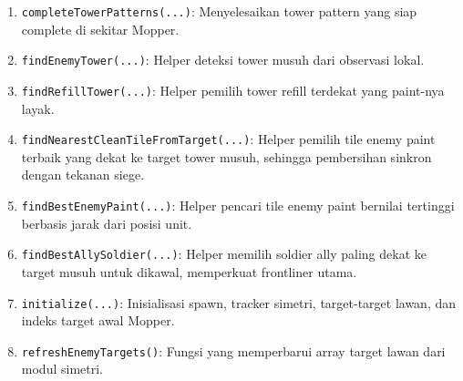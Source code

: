 \begin{enumerate}
	\item \texttt{completeTowerPatterns(...)}:
	      Menyelesaikan tower pattern yang siap complete di sekitar Mopper.

	\item \texttt{findEnemyTower(...)}:
	      Helper deteksi tower musuh dari observasi lokal.

	\item \texttt{findRefillTower(...)}:
	      Helper pemilih tower refill terdekat yang paint-nya layak.

	\item \texttt{findNearestCleanTileFromTarget(...)}:
	      Helper pemilih tile enemy paint terbaik yang dekat ke target tower musuh, sehingga pembersihan sinkron dengan tekanan siege.

	\item \texttt{findBestEnemyPaint(...)}:
	      Helper pencari tile enemy paint bernilai tertinggi berbasis jarak dari posisi unit.

	\item \texttt{findBestAllySoldier(...)}:
	      Helper memilih soldier ally paling dekat ke target musuh untuk dikawal, memperkuat frontliner utama.

	\item \texttt{initialize(...)}:
	      Inisialisasi spawn, tracker simetri, target-target lawan, dan indeks target awal Mopper.

	\item \texttt{refreshEnemyTargets()}:
	      Fungsi yang memperbarui array target lawan dari modul simetri.
\end{enumerate}

